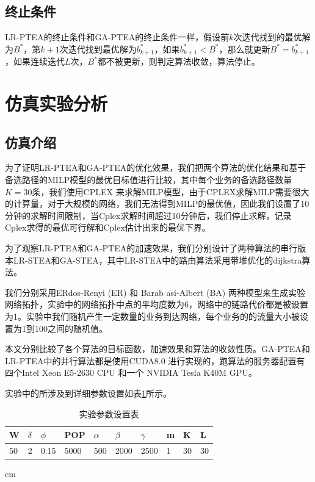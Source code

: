 \subsection{终止条件}
LR-PTEA的终止条件和GA-PTEA的终止条件一样，假设前$k$次迭代找到的最优解为$B^*$，第$k+1$次迭代找到最优解为$b_{k+1}^*$，如果$b_{k+1}^*<B^*$，那么就更新$B^*=b_{k+1}^*$，如果连续迭代$L$次，$B^*$都不被更新，则判定算法收敛，算法停止。
\section{仿真实验分析}

\subsection {仿真介绍}

为了证明LR-PTEA和GA-PTEA的优化效果，我们把两个算法的优化结果和基于备选路径的MILP模型的最优目标值进行比较，其中每个业务的备选路径数量$K=30$条，我们使用CPLEX 来求解MILP模型，由于CPLEX求解MILP需要很大的计算量，对于大规模的网络，我们无法得到MILP的最优值，因此我们设置了10分钟的求解时间限制，当Cplex求解时间超过10分钟后，我们停止求解，记录Cplex求得的最优可行解和Cplex估计出来的最优下界。

为了观察LR-PTEA和GA-PTEA的加速效果，我们分别设计了两种算法的串行版本LR-STEA和GA-STEA，其中LR-STEA中的路由算法采用带堆优化的dijkstra算法。

我们分别采用ERdos-Renyi (ER) 和 Barab asi-Albert (BA) 两种模型来生成实验网络拓扑，实验中的网络拓扑中点的平均度数为6，网络中的链路代价都是被设置为1。实验中我们随机产生一定数量的业务到达网络，每个业务的的流量大小被设置为1到100之间的随机值。

本文分别比较了各个算法的目标函数，加速效果和算法的收敛性质。GA-PTEA和LR-PTEA中的并行算法都是使用CUDA8.0 进行实现的，跑算法的服务器配置有四个Intel Xeon E5-2630 CPU 和一个 NVIDIA Tesla K40M GPU。

实验中的所涉及到详细参数设置如表\ref{paramter}所示。

\begin{table}[t]
\newcommand{\tabincell}[2]{\begin{tabular}{@{}#1@{}}#2\end{tabular}}
\centering
\scriptsize{
\renewcommand{\tabcolsep}{0.09cm}
\renewcommand{\arraystretch}{1.2}
\caption{实验参数设置表}
\begin{tabular}{| p{1.2cm} | p{1.2cm} | p{1.2cm} | p{1.2cm} | p{1.2cm} | p{1.2cm} | p{1.2cm} | p{1.2cm} | p{1.2cm} | p{1.2cm} |}
\hline
W&$\delta$&$\phi$&POP&$\alpha$&$\beta$&$\gamma$&m&K&L\\ \hline
50&2&0.15&5000&500&2000&2500&1&30&30\\ \hline
\end{tabular}
 cm
\label{paramter}
}
\end{table}

